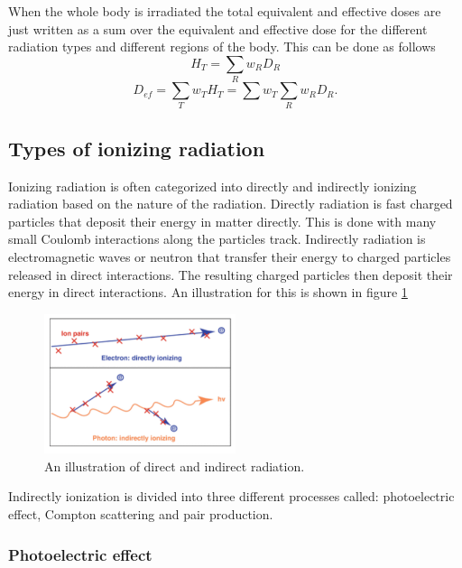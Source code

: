 \documentclass[jmp, amsmath, amssymb, reprint]{article}
\numberwithin{equation}{section}
\begin{document}
\begin{multicols}{2}
When the whole body is irradiated the total equivalent and effective doses are just written as a sum over the equivalent and effective dose for the different radiation types and different regions of the body. This can be done as follows
\begin{equation}
H_T=\sum_R w_RD_R
\end{equation}
\begin{equation}
D_{ef}=\sum_Tw_TH_T=\sum w_T\sum_R w_RD_R.
\end{equation}

\subsection{Types of ionizing radiation}

Ionizing radiation is often categorized into directly and indirectly ionizing radiation based on the nature of the radiation. Directly radiation is fast charged particles that deposit their energy in matter directly. This is done with many small Coulomb interactions along the particles track. Indirectly radiation is electromagnetic waves or neutron that transfer their energy to charged particles released in direct interactions. The resulting charged particles then deposit their energy in direct interactions. An illustration for this is shown in figure \ref{fig:direct_indirect}

\begin{figure}[H]
	\centering
  	\includegraphics[width=0.50\textwidth]{direct_indirect.png}
	\caption{An illustration of direct and indirect radiation.}
	\label{fig:direct_indirect}
\end{figure}

Indirectly ionization is divided into three different processes called: photoelectric effect, Compton scattering and pair production.

\subsubsection{Photoelectric effect}


\end{multicols}
\end{document}
